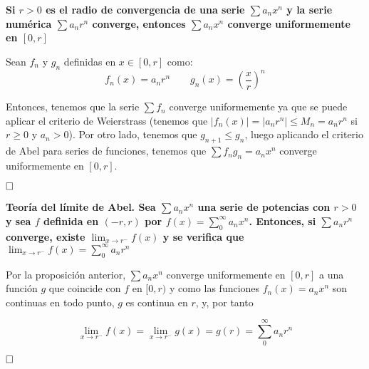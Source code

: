 \documentclass[a4paper]{article}
\newcommand{\qed}{\begin{flushright}
		{$\newline\square$}
	\end{flushright}}
\begin{document}
\textbf{Si $r>0$ es el radio de convergencia de una serie $\sum a_n x^n$ y la serie numérica $\sum a_nr^n$ converge, entonces $\sum a_nx^n$ converge uniformemente en $[0,r]$}

Sean $f_n$ y $g_n$ definidas en $x\in[0,r]$ como:
$$f_n(x) = a_nr^n \qquad g_n(x) = \left(\frac{x}{r}\right)^n$$

Entonces, tenemos que la serie $\sum f_n$ converge uniformemente ya que se puede aplicar el criterio de Weierstrass (tenemos que $|f_n(x)| = |a_nr^n| \le M_n = a_nr^n$ si $r\ge0$ y $a_n> 0$). Por otro lado, tenemos que $g_{n+1} \le g_{n}$, luego aplicando el criterio de Abel para series de funciones, tenemos que $\sum f_ng_n = a_nx^n$ converge uniformemente en $[0,r]$.\qed


\textbf{Teoría del límite de Abel. Sea $\sum a_n x^n$ una serie de potencias con $r>0$ y sea $f$ definida en $(-r,r)$ por $f(x) = \sum_0^{\infty} a_nx^n$. Entonces, si $\sum a_n r^n$ converge, existe $\lim_{x\rightarrow r^-}f(x)$ y se verifica que   $\lim_{x\rightarrow r^-}f(x) = \sum_0^{\infty} a_n r^n$}

Por la proposición anterior, $\sum a_nx^n$ converge uniformemente en $[0,r]$ a una función $g$ que coincide con $f$ en $[0,r)$ y como las funciones $f_n(x) = a_nx^n$ son continuas en todo punto, $g$ es continua en $r$, y, por tanto

$$\lim_{x\rightarrow r^-}f(x) = \lim_{x\rightarrow r^-}g(x) = g(r)  = \sum_0^{\infty} a_n r^n$$\qed
\end{document}
